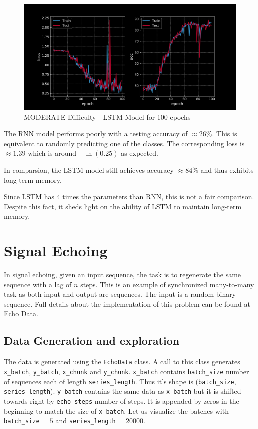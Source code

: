 \begin{figure}[H]
    \centering
    \includegraphics[width=0.5\linewidth]{labs/08/images/lstm_moderate_100.png}
    \caption{MODERATE Difficulty - LSTM Model for 100 epochs}
    \label{fig:lstm_moderate_100}
\end{figure}

The RNN model performs poorly with a testing accuracy of $\approx 26\%$. 
This is equivalent to randomly predicting one of the classes.
The corresponding loss is $\approx 1.39$ which is around $-\ln(0.25)$ as expected.

In comparsion, the LSTM model still achieves accuracy $\approx 84\%$ and thus exhibits long-term memory.

Since LSTM has 4 times the parameters than RNN, this is not a fair comparison. 
Despite this fact, it sheds light on the ability of LSTM to maintain long-term memory.

\section{Signal Echoing}
In signal echoing, given an input sequence, the task is to regenerate the same sequence with a lag of $n$ steps. 
This is an example of synchronized many-to-many task as both input and output are sequences. 
The input is a random binary sequence. 
Full details about the implementation of this problem can be found at \href{https://github.com/Atcold/pytorch-Deep-Learning-Minicourse/blob/master/09-echo\_data.ipynb}{Echo Data}.

\subsection{Data Generation and exploration}
The data is generated using the \texttt{EchoData} class. A call to this class generates \texttt{x\_batch}, \texttt{y\_batch}, \texttt{x\_chunk} and \texttt{y\_chunk}.
\texttt{x\_batch} contains \texttt{batch\_size} number of sequences each of length \texttt{series\_length}. Thus it's shape is (\texttt{batch\_size}, \texttt{series\_length}).
\texttt{y\_batch} contains the same data as \texttt{x\_batch} but it is shifted towards right by \texttt{echo\_steps} number of steps. It is appended by zeros in the beginning to match the size of \texttt{x\_batch}. 
Let us visualize the batches with \texttt{batch\_size} = $5$ and \texttt{series\_length} = $20000$.

